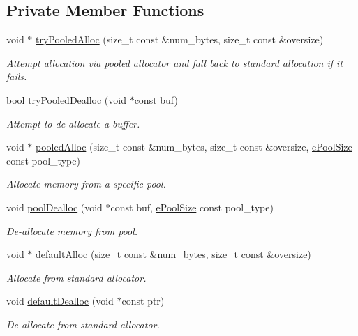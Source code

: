 \subsection*{Private Member Functions}
\begin{DoxyCompactItemize}
\item 
void $\ast$ \hyperlink{structvt_1_1pool_1_1_pool_abd5f079910c28493ad3b0d5a9469f00a}{try\+Pooled\+Alloc} (size\+\_\+t const \&num\+\_\+bytes, size\+\_\+t const \&oversize)
\begin{DoxyCompactList}\small\item\em Attempt allocation via pooled allocator and fall back to standard allocation if it fails. \end{DoxyCompactList}\item 
bool \hyperlink{structvt_1_1pool_1_1_pool_adf32f4660575880101522e5d6b640edd}{try\+Pooled\+Dealloc} (void $\ast$const buf)
\begin{DoxyCompactList}\small\item\em Attempt to de-\/allocate a buffer. \end{DoxyCompactList}\item 
void $\ast$ \hyperlink{structvt_1_1pool_1_1_pool_a8a6ff684a26b2229cbf263e99a1bc2ee}{pooled\+Alloc} (size\+\_\+t const \&num\+\_\+bytes, size\+\_\+t const \&oversize, \hyperlink{structvt_1_1pool_1_1_pool_ace8d36439e5e599a8ee68b2f1a6a6b28}{e\+Pool\+Size} const pool\+\_\+type)
\begin{DoxyCompactList}\small\item\em Allocate memory from a specific pool. \end{DoxyCompactList}\item 
void \hyperlink{structvt_1_1pool_1_1_pool_aa9ae08727c21035461d6f60b93ea19ab}{pool\+Dealloc} (void $\ast$const buf, \hyperlink{structvt_1_1pool_1_1_pool_ace8d36439e5e599a8ee68b2f1a6a6b28}{e\+Pool\+Size} const pool\+\_\+type)
\begin{DoxyCompactList}\small\item\em De-\/allocate memory from pool. \end{DoxyCompactList}\item 
void $\ast$ \hyperlink{structvt_1_1pool_1_1_pool_ad9eb4c0efa76dc46487e23e265554943}{default\+Alloc} (size\+\_\+t const \&num\+\_\+bytes, size\+\_\+t const \&oversize)
\begin{DoxyCompactList}\small\item\em Allocate from standard allocator. \end{DoxyCompactList}\item 
void \hyperlink{structvt_1_1pool_1_1_pool_a8d8654019bf80cd274bea1797645db37}{default\+Dealloc} (void $\ast$const ptr)
\begin{DoxyCompactList}\small\item\em De-\/allocate from standard allocator. \end{DoxyCompactList}\end{DoxyCompactItemize}
